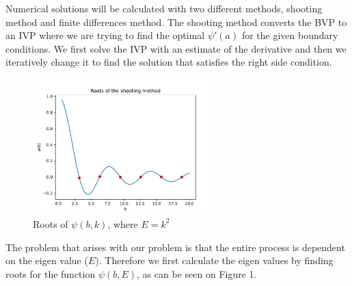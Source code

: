 \documentclass[12pt, a4paper]{article}
\begin{document}
Numerical solutions will be calculated with two different methods, shooting method and finite differences method. The shooting method converts the BVP to an IVP where we are trying to find the optimal $\psi'(a)$ for the given boundary conditions. We first solve the IVP with an estimate of the derivative and then we iteratively change it to find the solution that satisfies the right side condition. 

\begin{figure}[hbtp]
  \begin{center}
  \includegraphics[width=7cm]{roots.pdf}
  \end{center}
  \vspace*{-7mm}
  \caption{Roots of $\psi(b, k)$, where $E = k^2$}
\end{figure}

The problem that arises with our problem is that the entire process is dependent on the eigen value ($E$). Therefore we first calculate the eigen values by finding roots for the function $\psi(b, E)$, as can be seen on Figure 1.
\end{document}

